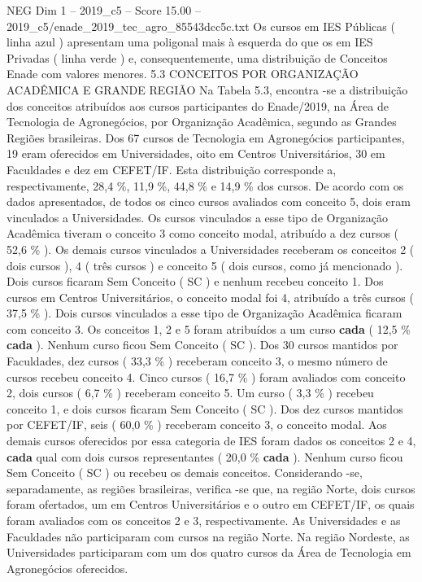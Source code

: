 \begin{textsample}{NEG Dim 1 – 2019\_c5 – Score 15.00 – 2019\_c5/enade\_2019\_tec\_agro\_85543dcc5c.txt}
Os cursos em IES Públicas ( linha azul ) apresentam uma poligonal mais à esquerda do que os em IES Privadas ( linha verde ) e, consequentemente, uma distribuição de Conceitos Enade com valores menores. 5.3 CONCEITOS POR ORGANIZAÇÃO ACADÊMICA E GRANDE REGIÃO Na Tabela 5.3, encontra -se a distribuição dos conceitos atribuídos aos cursos participantes do Enade/2019, na Área de Tecnologia de Agronegócios, por Organização Acadêmica, segundo as Grandes Regiões brasileiras.
Dos 67 cursos de Tecnologia em Agronegócios participantes, 19 eram oferecidos em Universidades, oito em Centros Universitários, 30 em Faculdades e dez em CEFET/IF.
Esta distribuição corresponde a, respectivamente, 28,4 \%, 11,9 \%, 44,8 \% e 14,9 \% dos cursos.
De acordo com os dados apresentados, de todos os cinco cursos avaliados com conceito 5, dois eram vinculados a Universidades.
Os cursos vinculados a esse tipo de Organização Acadêmica tiveram o conceito 3 como conceito modal, atribuído a dez cursos ( 52,6 \% ).
Os demais cursos vinculados a Universidades receberam os conceitos 2 ( dois cursos ), 4 ( três cursos ) e conceito 5 ( dois cursos, como já mencionado ).
Dois cursos ficaram Sem Conceito ( SC ) e nenhum recebeu conceito 1.
Dos cursos em Centros Universitários, o conceito modal foi 4, atribuído a três cursos ( 37,5 \% ).
Dois cursos vinculados a esse tipo de Organização Acadêmica ficaram com conceito 3.
Os conceitos 1, 2 e 5 foram atribuídos a um curso \textbf{cada} ( 12,5 \% \textbf{cada} ).
Nenhum curso ficou Sem Conceito ( SC ).
Dos 30 cursos mantidos por Faculdades, dez cursos ( 33,3 \% ) receberam conceito 3, o mesmo número de cursos recebeu conceito 4.
Cinco cursos ( 16,7 \% ) foram avaliados com conceito 2, dois cursos ( 6,7 \% ) receberam conceito 5.
Um curso ( 3,3 \% ) recebeu conceito 1, e dois cursos ficaram Sem Conceito ( SC ).
Dos dez cursos mantidos por CEFET/IF, seis ( 60,0 \% ) receberam conceito 3, o conceito modal.
Aos demais cursos oferecidos por essa categoria de IES foram dados os conceitos 2 e 4, \textbf{cada} qual com dois cursos representantes ( 20,0 \% \textbf{cada} ).
Nenhum curso ficou Sem Conceito ( SC ) ou recebeu os demais conceitos.
Considerando -se, separadamente, as regiões brasileiras, verifica -se que, na região Norte, dois cursos foram ofertados, um em Centros Universitários e o outro em CEFET/IF, os quais foram avaliados com os conceitos 2 e 3, respectivamente.
As Universidades e as Faculdades não participaram com cursos na região Norte.
Na região Nordeste, as Universidades participaram com um dos quatro cursos da Área de Tecnologia em Agronegócios oferecidos.

\end{textsample}
